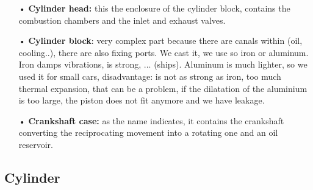 			\begin{itemize}
				\item[•] \textbf{Cylinder head:}	this the enclosure of the cylinder block, contains the combustion chambers and the inlet and exhaust valves. \\		
			
				\item[•] \textbf{Cylinder block}: very complex part because there are canals within (oil, cooling..), there are also fixing ports. We cast it, we use so iron or aluminum. Iron damps vibrations, is strong, ... (ships). Aluminum is much lighter, so we used it for small cars, disadvantage: is not as strong as iron, too much thermal expansion, that can be a problem, if the dilatation of the aluminium is too large, the piston does not fit anymore and we have leakage. \\
				
				\item[•]	\textbf{Crankshaft case:} as the name indicates, it contains the crankshaft converting the reciprocating movement into a rotating one and an oil reservoir. 
			\end{itemize}						
			
			\subsection{Cylinder}
						

